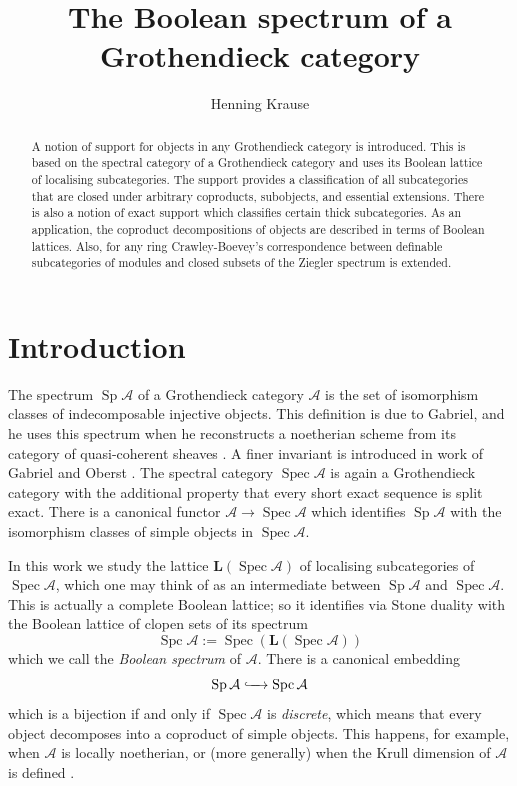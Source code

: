\documentclass[a4paper]{amsart}
\title{The Boolean spectrum of a Grothendieck category}
\author{Henning Krause}
\theoremstyle{plain}
\theoremstyle{definition}
\theoremstyle{remark}
\numberwithin{equation}{section}
\newcommand{\Sp}{\operatorname{Sp}}
\newcommand{\Spc}{\operatorname{Spc}}
\newcommand{\Spec}{\operatorname{Spec}}
\def\A{\mathcal A}
\def\bfL{\mathbf L}
\begin{document}



\begin{abstract}
  A notion of support for objects in any Grothendieck category is
  introduced. This is based on the spectral category of a Grothendieck
  category and uses its Boolean lattice of localising
  subcategories. The support provides a classification of all
  subcategories that are closed under arbitrary coproducts,
  subobjects, and essential extensions.  There is also a notion of
  exact support which classifies certain thick subcategories.  As an
  application, the coproduct decompositions of objects are described
  in terms of Boolean lattices. Also, for any ring Crawley-Boevey's
  correspondence between definable subcategories of modules and closed
  subsets of the Ziegler spectrum is extended.
\end{abstract}

\maketitle

\section{Introduction}

The spectrum $\Sp\A$ of a Grothendieck category $\A$ is the set of
isomorphism classes of indecomposable injective objects. This
definition is due to Gabriel, and he uses this spectrum when he
reconstructs a noetherian scheme from its category of quasi-coherent
sheaves \cite{Ga1962}. A finer invariant is introduced in work of
Gabriel and Oberst \cite{GO1966}. The spectral category $\Spec\A$ is
again a Grothendieck category with the additional property that every
short exact sequence is split exact. There is a canonical functor
$\A\to\Spec\A$ which identifies $\Sp\A$ with the isomorphism classes of
simple objects in $\Spec\A$.

In this work we study the lattice $\bfL(\Spec\A)$ of localising
subcategories of $\Spec\A$, which one may think of as an intermediate
between $\Sp\A$ and $\Spec\A$.  This is actually a complete
Boolean lattice; so it identifies via Stone duality with the Boolean
lattice of clopen sets of its spectrum
\[\Spc\A:=\Spec(\bfL(\Spec\A))\] which we call the \emph{Boolean
  spectrum} of $\A$. There is a canonical embedding
\[\Sp\A\lhook\joinrel\xrightarrow{\ \ \ }\Spc\A\]
which is a bijection if and only if $\Spec\A$ is \emph{discrete},
which means that every object decomposes into a coproduct of simple
objects. This happens, for example, when $\A$ is locally
noetherian, or (more generally) when the Krull dimension of $\A$ is
defined \cite[IV.1]{Ga1962}.
\end{document}
